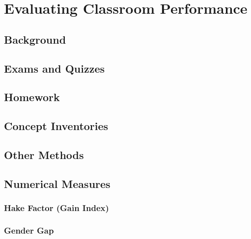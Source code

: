 \chapter[Chapter 4: Evaluating Classroom Performance]{Evaluating Classroom Performance}

\section{Background}

\section{Exams and Quizzes}

\section{Homework}

\section{Concept Inventories}

\section{Other Methods}

\section{Numerical Measures}

\subsection{Hake Factor (Gain Index)}

\subsection{Gender Gap}
